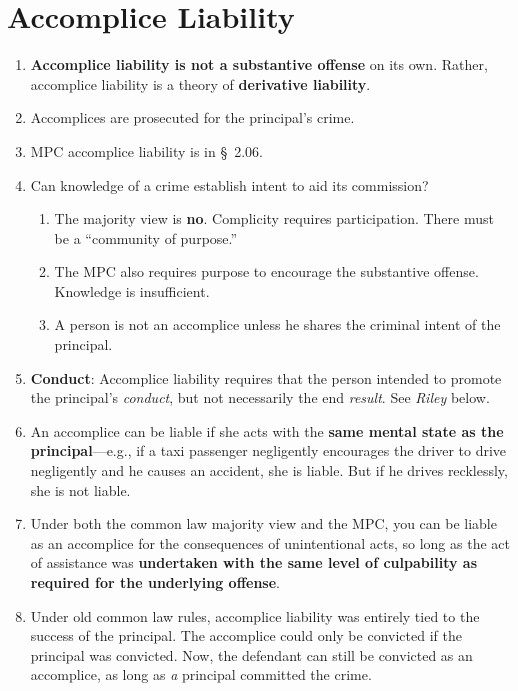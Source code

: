 \section{Accomplice Liability}

\begin{enumerate}
    \item \textbf{Accomplice liability is not a substantive offense} on its 
    own. Rather, accomplice liability is a theory of \textbf{derivative 
    liability}.
    \item Accomplices are prosecuted for the principal's crime.
    \item MPC accomplice liability is in \S\ 2.06.
    \item Can knowledge of a crime establish intent to aid its commission?
    \begin{enumerate}
        \item The majority view is \textbf{no}. Complicity requires 
        participation. There must be a ``community of purpose.''
        \item The MPC also requires purpose to encourage the substantive 
        offense. Knowledge is insufficient.
        \item A person is not an accomplice unless he shares the criminal 
        intent of the principal.
    \end{enumerate}
    \item \textbf{Conduct}: Accomplice liability requires that the person 
    intended to promote the principal's \emph{conduct}, but not necessarily 
    the end \emph{result}. See \emph{Riley} below.
    \item An accomplice can be liable if she acts with the \textbf{same mental 
    state as the principal}---e.g., if a taxi passenger negligently encourages 
    the driver to drive negligently and he causes an accident, she is liable. 
    But if he drives recklessly, she is not liable.
    \item Under both the common law majority view and the MPC, you can be 
    liable as an accomplice for the consequences of unintentional acts, so long 
    as the act of assistance was \textbf{undertaken with the same level of 
    culpability as required for the underlying offense}.
    \item Under old common law rules, accomplice liability was entirely tied 
    to the success of the principal. The accomplice could only be convicted if 
    the principal was convicted. Now, the defendant can still be convicted as 
    an accomplice, as long as \emph{a} principal committed the crime.

\end{enumerate}

